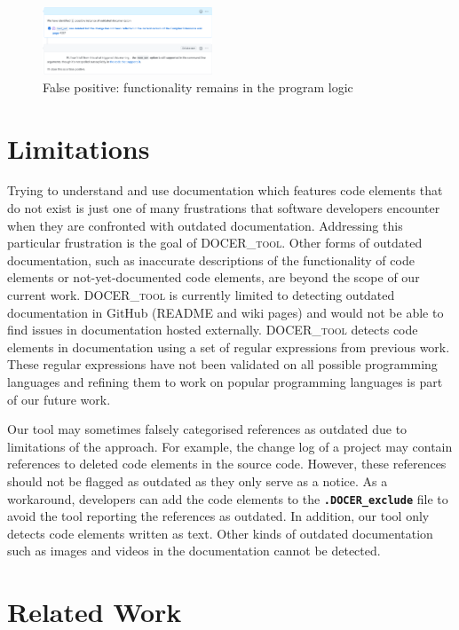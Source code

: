 \documentclass[conference]{IEEEtran}
\newcommand{\codeword}[1]{\texttt{\textbf{\footnotesize#1}}}
\newcommand{\tool}{\textsc{DOCER\_tool}}
\begin{document}
\begin{figure}[htbp]
    \centering
    \includegraphics[width=0.45\textwidth]{google_gnostic.png}
    \caption{False positive: functionality remains in the program logic}
    \label{fig:gnostic}
\end{figure}

\section{Limitations}
\label{sec:limitations}
Trying to understand and use documentation which features code elements that do not exist is just one of many frustrations that software developers encounter when they are confronted with outdated documentation. Addressing this particular frustration is the goal of \tool{}. Other forms of outdated documentation, such as inaccurate descriptions of the functionality of code elements or not-yet-documented code elements, are beyond the scope of our current work. \tool{} is currently limited to detecting outdated documentation in GitHub (README and wiki pages) and would not be able to find issues in documentation hosted externally. \tool{} detects code elements in documentation using a set of regular expressions from previous work. These regular expressions have not been validated on all possible programming languages and refining them to work on popular programming languages is part of our future work.

Our tool may sometimes falsely categorised references as outdated due to limitations of the approach. For example, the change log of a project may contain references to deleted code elements in the source code. However, these references should not be flagged as outdated as they only serve as a notice. As a workaround, developers can add the code elements to the \codeword{.DOCER\_exclude} file to avoid the tool reporting the references as outdated. In addition, our tool only detects code elements written as text. Other kinds of outdated documentation such as images and videos in the documentation cannot be detected.

\section{Related Work}
\label{sec:related}
\end{document}

